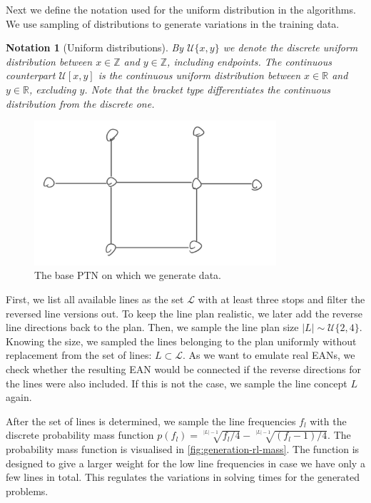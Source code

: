 \documentclass[english, 12pt, a4paper, sci, utf8, a-2b, online]{aaltothesis}
\newtheorem{notation}{Notation}
\newcommand{\Z}{\mathbb{Z}}
\newcommand{\R}{\mathbb{R}}
\newcommand{\unif}[1]{\mathcal{U}\{#1\}}
\newcommand{\unifcont}[1]{\mathcal{U}[#1]}
\begin{document}
Next we define the notation used for the uniform distribution in the algorithms. We use sampling of distributions to generate variations in the training data.
\begin{notation}[Uniform distributions]
    By $\mathcal{U}\{x, y\}$ we denote the discrete uniform distribution between $x \in \Z$ and $y\in \Z$, including endpoints. The continuous counterpart $\mathcal{U}[x, y]$ is the continuous uniform distribution between $x \in \R$ and $y \in \R$, excluding $y$. Note that the bracket type differentiates the continuous distribution from the discrete one.
\end{notation}


\begin{figure}
    \centering
    \includegraphics[width=0.8\textwidth]{figures/base-ptn.jpg}
    \caption{The base PTN on which we generate data.}
    \label{fig:base-ptn}
\end{figure}


First, we list all available lines as the set $\mathcal{L}$ with at least three stops and filter the reversed line versions out. To keep the line plan realistic, we later add the reverse line directions back to the plan. Then, we sample the line plan size $|L| \sim \unif{2, 4}$. Knowing the size, we sampled the lines belonging to the plan uniformly without replacement from the set of lines: $L \subset \mathcal{L}$. As we want to emulate real EANs, we check whether the resulting EAN would be connected if the reverse directions for the lines were also included. If this is not the case, we sample the line concept $L$ again.



After the set of lines is determined, we sample the line frequencies $f_l$ with the discrete probability mass function $p(f_l) = \sqrt[|L| - 1]{f_l / 4} - \sqrt[|L| - 1]{(f_l - 1) / 4}$. The probability mass function is visualised in \cref{fig:generation-rl-mass}. The function is designed to give a larger weight for the low line frequencies in case we have only a few lines in total. This regulates the variations in solving times for the generated problems. %
\end{document}
